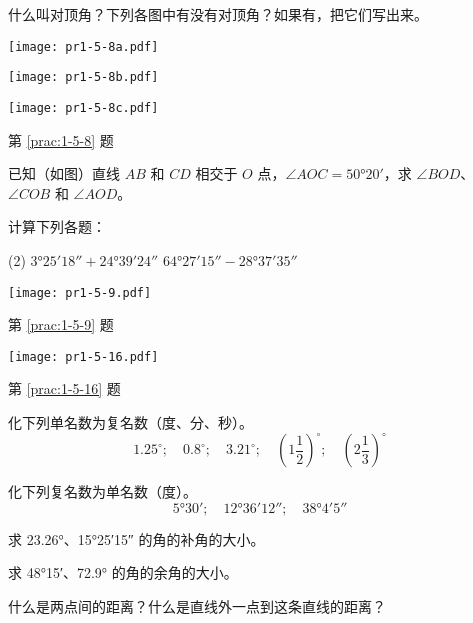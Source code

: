\begin{Practice}
\begin{question}
	\item\label{prac:1-5-8} 什么叫对顶角？下列各图中有没有对顶角？如果有，把它们写出来。
	\begin{figurehere}
		\begin{minipage}{\linewidth}
		\begin{minipage}[b]{0.3\linewidth}\centering
			\texttt{[image: pr1-5-8a.pdf]}
			\subcaption{}
		\end{minipage}%
		\begin{minipage}[b]{0.3\linewidth}\centering
			\texttt{[image: pr1-5-8b.pdf]}
			\subcaption{}
		\end{minipage}%
		\begin{minipage}[b]{0.4\linewidth}\centering
			\texttt{[image: pr1-5-8c.pdf]}
			\subcaption{}
		\end{minipage}
		\caption*{第 \ref{prac:1-5-8} 题}
		\end{minipage}
	\end{figurehere}
	\item\label{prac:1-5-9} 已知（如图）直线 $AB$ 和 $CD$ 相交于 $O$ 点，$\angle AOC=\ang{50;20;}$，求 $\angle BOD$、$\angle COB$ 和 $\angle AOD$。
	\item 计算下列各题：
	\begin{tasks}(2)
		\task $\ang{3;25;18}+\ang{24;39;24}$
		\task $\ang{64;27;15}-\ang{28;37;35}$
	\end{tasks}
	\begin{figurehere}
		\begin{minipage}[b]{0.48\linewidth}
			\centering
			\texttt{[image: pr1-5-9.pdf]}
			\caption*{第 \ref{prac:1-5-9} 题}
		\end{minipage}
		\begin{minipage}[b]{0.48\linewidth}
			\centering
			\texttt{[image: pr1-5-16.pdf]}
			\caption*{第 \ref{prac:1-5-16} 题}
			\end{minipage}
	\end{figurehere}
	\item 化下列单名数为复名数（度、分、秒）。
	\[1.25^{\circ};\quad 0.8^{\circ};\quad 3.21^{\circ};\quad (1\frac{1}{2})^{\circ};\quad (2\frac{1}{3})^{\circ}\]
	\item 化下列复名数为单名数（度）。
	\[\ang{5;30;};\quad \ang{12;36;12};\quad \ang{38;4;5}\]
	\item 求 \ang{23.26}、\ang{15;25;15} 的角的补角的大小。
	\item 求 \ang{48;15;}、\ang{72.9} 的角的余角的大小。
	\item 什么是两点间的距离？什么是直线外一点到这条直线的距离？

\end{question}
\end{Practice}
